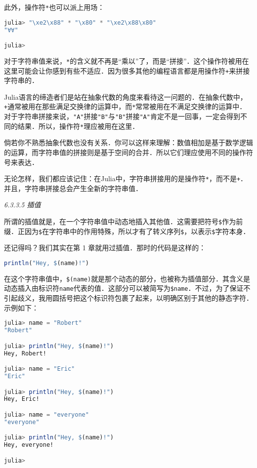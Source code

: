 此外，操作符\verb|*|也可以派上用场：
\begin{lstlisting}[language=julia]
julia> "\xe2\x88" * "\x80" * "\xe2\x88\x80"
"∀∀"

julia> 
\end{lstlisting}

对于字符串值来说，\verb|*|的含义就不再是“乘以”了，而是“拼接”．这个操作符被用在这里可能会让你感到有些不适应．因为很多其他的编程语言都是用操作符\verb|+|来拼接字符串的．

Julia语言的缔造者们是站在抽象代数的角度来看待这一问题的．在抽象代数中，\verb|+|通常被用在那些满足交换律的运算中，而\verb|*|常常被用在不满足交换律的运算中．对于字符串拼接来说，\verb|"A"|拼接\verb|"B"|与\verb|"B"|拼接\verb|"A"|肯定不是一回事，一定会得到不同的结果．所以，操作符\verb|*|理应被用在这里．

倘若你不熟悉抽象代数也没有关系．你可以这样来理解：数值相加是基于数学逻辑的运算，而字符串值的拼接则是基于空间的合并．所以它们理应使用不同的操作符号来表达．

无论怎样，我们都应该记住：在Julia中，字符串拼接用的是操作符\verb|*|，而不是\verb|+|．并且，字符串拼接总会产生全新的字符串值．

\textsl{6.3.3.5 插值}

所谓的插值就是，在一个字符串值中动态地插入其他值．这需要把符号\verb|$|作为前缀．正因为\verb|$|在字符串中的作用特殊，所以才有了转义序列\verb|$|，以表示\verb|$|字符本身．

还记得吗？我们其实在第 1 章就用过插值．那时的代码是这样的：
\begin{lstlisting}[language=julia]
println("Hey, $(name)!")
\end{lstlisting}

在这个字符串值中，\verb|$(name)|就是那个动态的部分，也被称为插值部分．其含义是动态插入由标识符\verb|name|代表的值．这部分可以被简写为\verb|$name|．不过，为了保证不引起歧义，我用圆括号把这个标识符包裹了起来，以明确区别于其他的静态字符．示例如下：
\begin{lstlisting}[language=julia]
julia> name = "Robert"
"Robert"

julia> println("Hey, $(name)!")
Hey, Robert!

julia> name = "Eric"
"Eric"

julia> println("Hey, $(name)!")
Hey, Eric!

julia> name = "everyone"
"everyone"

julia> println("Hey, $(name)!")
Hey, everyone!

julia> 
\end{lstlisting}

